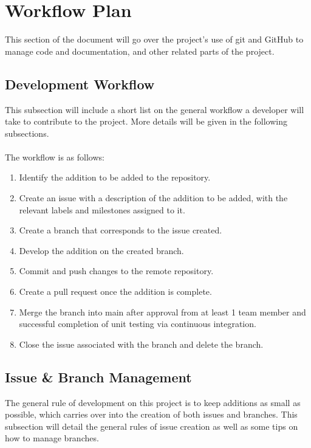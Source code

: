 \documentclass{article}
\begin{document}

\section{Workflow Plan}

This section of the document will go over the project's use of git and GitHub to manage code and documentation, and other related parts of the project.

\subsection{Development Workflow}
This subsection will include a short list on the general workflow a developer will take to contribute to the project. More details will be given in the following subsections.
\\\\
The workflow is as follows:

\begin{enumerate}
    \item Identify the addition to be added to the repository.
    \item Create an issue with a description of the addition to be added, with the relevant labels and milestones assigned to it.
    \item Create a branch that corresponds to the issue created.
    \item Develop the addition on the created branch.
    \item Commit and push changes to the remote repository.
    \item Create a pull request once the addition is complete.
    \item Merge the branch into main after approval from at least 1 team member and successful completion of unit testing via continuous integration.
    \item Close the issue associated with the branch and delete the branch.
\end{enumerate}

\subsection{Issue \& Branch Management}
\label{sec:issuem}

The general rule of development on this project is to keep additions as small as possible, which carries over into the creation of both issues and branches. This subsection will detail the general rules of issue creation as well as some tips on how to manage branches.
\end{document}
